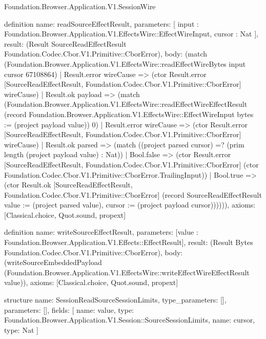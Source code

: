 \begin{lexlean}{Foundation.Browser.Application.V1.SessionWire}
\begin{semanticmodule}
definition{
  name: readSourceEffectResult,
  parameters: [
    input : Foundation.Browser.Application.V1.EffectsWire::EffectWireInput,
    cursor : Nat
  ],
  result: (Result SourceReadEffectResult Foundation.Codec.Cbor.V1.Primitive::CborError),
  body: (match (Foundation.Browser.Application.V1.EffectsWire::readEffectWireBytes input cursor 67108864)
    | Result.error wireCause => (ctor Result.error [SourceReadEffectResult, Foundation.Codec.Cbor.V1.Primitive::CborError] wireCause)
    | Result.ok payload => (match (Foundation.Browser.Application.V1.EffectsWire::readEffectWireEffectResult (record Foundation.Browser.Application.V1.EffectsWire::EffectWireInput {bytes := (project payload value)}) 0)
      | Result.error wireCause => (ctor Result.error [SourceReadEffectResult, Foundation.Codec.Cbor.V1.Primitive::CborError] wireCause)
      | Result.ok parsed => (match ((project parsed cursor) =? (prim length (project payload value) : Nat))
        | Bool.false => (ctor Result.error [SourceReadEffectResult, Foundation.Codec.Cbor.V1.Primitive::CborError] (ctor Foundation.Codec.Cbor.V1.Primitive::CborError.TrailingInput))
        | Bool.true => (ctor Result.ok [SourceReadEffectResult, Foundation.Codec.Cbor.V1.Primitive::CborError] (record SourceReadEffectResult {value := (project parsed value), cursor := (project payload cursor)}))))),
  axioms: [Classical.choice, Quot.sound, propext]
}

definition{
  name: writeSourceEffectResult,
  parameters: [value : Foundation.Browser.Application.V1.Effects::EffectResult],
  result: (Result Bytes Foundation.Codec.Cbor.V1.Primitive::CborError),
  body: (writeSourceEmbeddedPayload (Foundation.Browser.Application.V1.EffectsWire::writeEffectWireEffectResult value)),
  axioms: [Classical.choice, Quot.sound, propext]
}

structure{
  name: SessionReadSourceSessionLimits,
  type_parameters: [],
  parameters: [],
  fields: [
    {name: value, type: Foundation.Browser.Application.V1.Session::SourceSessionLimits},
    {name: cursor, type: Nat}
  ]
}


\end{semanticmodule}
\end{lexlean}
